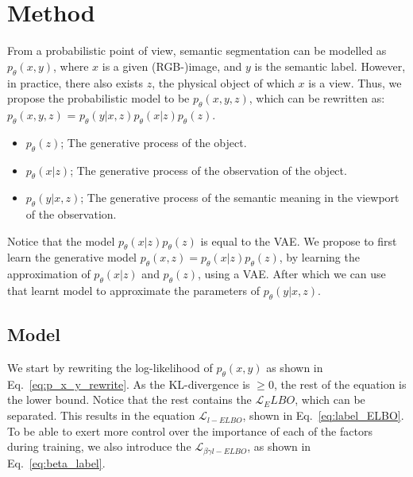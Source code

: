 \chapter{Method}\label{chapter:first_real_chapter}
From a probabilistic point of view, semantic segmentation can be modelled as $p_\theta(x,y)$, where $x$ is a given (RGB-)image, and $y$ is the semantic label. However, in practice, there also exists $z$, the physical object of which $x$ is a view. Thus, we propose the probabilistic model to be $p_\theta(x,y,z)$, which can be rewritten as: $p_\theta(x,y,z)$ = $p_\theta(y|x,z) p_\theta(x|z) p_\theta(z)$.
\begin{itemize}
    \item $p_\theta(z)$; The generative process of the object.
    \item $p_\theta(x|z)$; The generative process of the observation of the object.
    \item $p_\theta(y|x,z)$; The generative process of the semantic meaning in the viewport of the observation.
\end{itemize}
Notice that the model $p_\theta(x|z) p_\theta(z)$ is equal to the VAE. We propose to first learn the generative model $p_\theta(x,z) = p_\theta(x|z) p_\theta(z)$, by learning the approximation of $p_\theta(x|z)$ and $p_\theta(z)$, using a VAE. After which we can use that learnt model to approximate the parameters of $p_\theta(y|x,z)$.

\section{Model}
We start by rewriting the log-likelihood of $p_\theta(x, y)$ as shown in Eq.~\ref{eq:p_x_y_rewrite}. As the KL-divergence is $\geq 0$, the rest of the equation is the lower bound. Notice that the rest contains the $\mathcal{L}_ELBO$, which can be separated. This results in the equation $\mathcal{L}_{l-ELBO}$, shown in Eq.~\ref{eq:label_ELBO}. To be able to exert more control over the importance of each of the factors during training, we also introduce the $\mathcal{L}_{\beta\gamma l-ELBO}$, as shown in Eq.~\ref{eq:beta_label}.

